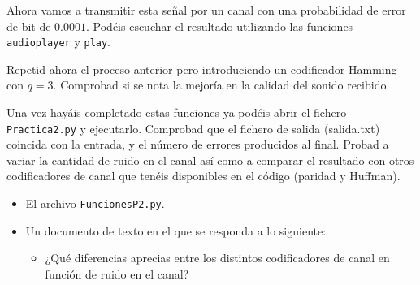 \documentclass[es,practica]{uah}
\begin{document}
Ahora vamos a transmitir esta señal por un canal con una probabilidad de error de bit de $0.0001$. Podéis escuchar el resultado utilizando las funciones \texttt{audioplayer} y \texttt{play}. 

Repetid ahora el proceso anterior pero introduciendo un codificador Hamming con $q=3$. Comprobad si se nota la mejoría en la calidad del sonido recibido. 



Una vez hayáis completado estas funciones ya podéis abrir el fichero \texttt{Practica2.py} y ejecutarlo. Comprobad que el fichero de salida (salida.txt) coincida con la entrada, y el número de errores producidos al final. Probad a variar la cantidad de ruido en el canal así como a comparar el resultado con otros codificadores de canal que tenéis disponibles en el código (paridad y Huffman).

\begin{itemize}
	\item El archivo \texttt{FuncionesP2.py}.
	\item Un documento de texto en el que se responda a lo siguiente:
	\begin{itemize}
		\item ¿Qué diferencias aprecias entre los distintos codificadores de canal en función de ruido en el canal?
	\end{itemize}
\end{itemize}



\end{document}
